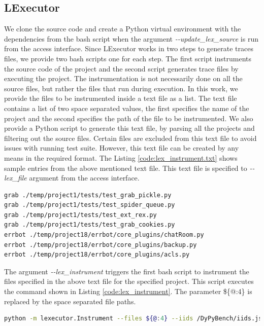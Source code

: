 \subsection{LExecutor}
We clone the source code and create a Python virtual environment with the dependencies from the bash script when the argument \textit{\--\--update\_lex\_source} is run from the access interface.
Since LExecutor works in two steps to generate traces files, we provide two bash scripts one for each step.
The first script instruments the source code of the project and the second script generates trace files by executing the project.  
The instrumentation is not necessarily done on all the source files, but rather the files that run during execution.
In this work, we provide the files to be instrumented inside a text file as a list.
The text file contains a list of two space separated values, the first specifies the name of the project and the second specifies the path of the file to be instrumented.
We also provide a Python script to generate this text file, by parsing all the projects and filtering out the source files.
Certain files are excluded from this text file to avoid issues with running test suite.
However, this text file can be created by any means in the required format.
The Listing \ref{code:lex_instrument.txt} shows sample entries from the above mentioned text file.
This text file is specified to \textit{\--\--lex\_file} argument from the access interface.

\newpage
\begin{lstlisting}[caption=lex\_instrument\_all.txt,label=code:lex_instrument.txt,language=Bash]
grab ./temp/project1/tests/test_grab_pickle.py
grab ./temp/project1/tests/test_spider_queue.py
grab ./temp/project1/tests/test_ext_rex.py
grab ./temp/project1/tests/test_grab_cookies.py
errbot ./temp/project18/errbot/core_plugins/chatRoom.py
errbot ./temp/project18/errbot/core_plugins/backup.py
errbot ./temp/project18/errbot/core_plugins/acls.py
\end{lstlisting}

The argument \textit{\--\--lex\_instrument} triggers the first bash script to instrument the files specified in the above text file for the specified project.
This script executes the command shown in Listing \ref{code:lex_instrument}.
The parameter \$\{@:4\} is replaced by the space separated file paths. 
\begin{lstlisting}[caption=LExecutor Instrumentation,label=code:lex_instrument,language=Bash]
python -m lexecutor.Instrument --files ${@:4} --iids /DyPyBench/iids.json --validate
\end{lstlisting}

